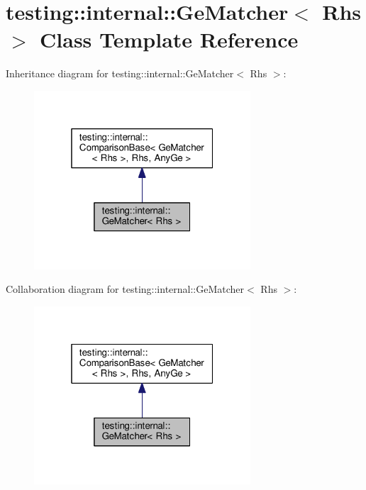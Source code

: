 \hypertarget{classtesting_1_1internal_1_1GeMatcher}{}\section{testing\+:\+:internal\+:\+:Ge\+Matcher$<$ Rhs $>$ Class Template Reference}
\label{classtesting_1_1internal_1_1GeMatcher}


Inheritance diagram for testing\+:\+:internal\+:\+:Ge\+Matcher$<$ Rhs $>$\+:\nopagebreak
\begin{figure}[H]
\begin{center}
\leavevmode
\includegraphics[width=229pt]{classtesting_1_1internal_1_1GeMatcher__inherit__graph}
\end{center}
\end{figure}


Collaboration diagram for testing\+:\+:internal\+:\+:Ge\+Matcher$<$ Rhs $>$\+:\nopagebreak
\begin{figure}[H]
\begin{center}
\leavevmode
\includegraphics[width=229pt]{classtesting_1_1internal_1_1GeMatcher__coll__graph}
\end{center}
\end{figure}
